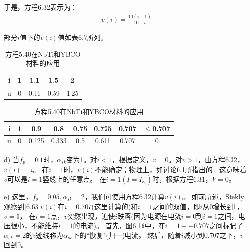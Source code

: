 于是，方程6.32表示为：
\begin{align*}%
v(i)=\frac{10(i-1)}{10-i} \tag{S5.5}
\end{align*}

部分$i$值下的$v(i)$值如表6.7所列。

\begin{table}[htbp]\small
\centering
\caption{方程5.40在NbTi和YBCO材料的应用} %
\begin{tabular}{|c|c|c|c|c|}
\hline
i & 1 & 1.1  & 1.5  & 2    \\ \hline
u & 0 & 0.11 & 0.59 & 1.25 \\ \hline
\end{tabular}
\end{table}


\begin{table}[htbp]\small
\centering
\caption{方程5.40在NbTi和YBCO材料的应用} %
\begin{tabular}{|c|c|c|c|c|c|c|c|}
\hline
i & 1 & 0.9   & 0.8   & 0.75 & 0.725 & 0.707 & $\leq$0.707 \\ \hline
u & 0 & 0.125 & 0.333 & 0.5  & 0.611 & 0.707 & 0     \\ \hline
\end{tabular}
\end{table}


d) 当$f_p=0.1$时，$\alpha_{sk}$变为1。对$i<1$，根据定义，$v=0$。对$v>1$，由方程6.32，$v(i)=i$。
在$i=1$时，$v(i)$不能确定；物理上，如讨论6.1所指出的，这意味着$v$可以是$i=1$竖线上的任意点。
在$i=1(I=I_{c_o})$时，根据方程6.31，$V=0$。

e) 这里，$f_p = 0.05,\alpha_{sk} = 2$，我们可使用方程6.32计算$v(i)$。
如前所述，Stekly观察到[6.63]$v(i)$在$i=0.707$(这里计算的)和$i= 1$之间的双值，即$i$从0增长到1，$v=0$，
在$i=1$点，$v$突然出现，迫使$i$跌落(因为电源在电流$i=0$到$i=1$之间，电压很小，不能维持$i=1$的电流)。
首先，图6.16中，在$i=1--0.707$之间标记了$\alpha_{sk}=2$的$v$迹线称为$\alpha_{sk}$下的``恢复"(归一)电流。
然后，随着$i$减小到0.707之下，$v$回到0。 


